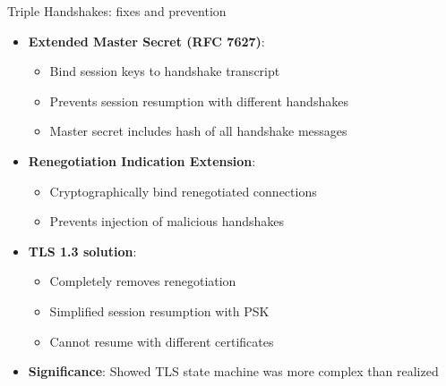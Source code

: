 \ifdefined\PRESENTATION\else\PassOptionsToClass{handout}{beamer}\fi\documentclass[aspectratio=169, lualatex]{beamer}
\begin{document}
\begin{frame}{Triple Handshakes: fixes and prevention}
	\begin{itemize}
		\item \textbf{Extended Master Secret (RFC 7627)}:
		      \begin{itemize}
			      \item Bind session keys to handshake transcript
			      \item Prevents session resumption with different handshakes
			      \item Master secret includes hash of all handshake messages
		      \end{itemize}
		\item \textbf{Renegotiation Indication Extension}:
		      \begin{itemize}
			      \item Cryptographically bind renegotiated connections
			      \item Prevents injection of malicious handshakes
		      \end{itemize}
		\item \textbf{TLS 1.3 solution}:
		      \begin{itemize}
			      \item Completely removes renegotiation
			      \item Simplified session resumption with PSK
			      \item Cannot resume with different certificates
		      \end{itemize}
		\item \textbf{Significance}: Showed TLS state machine was more complex than realized
	\end{itemize}
\end{frame}
\end{document}
